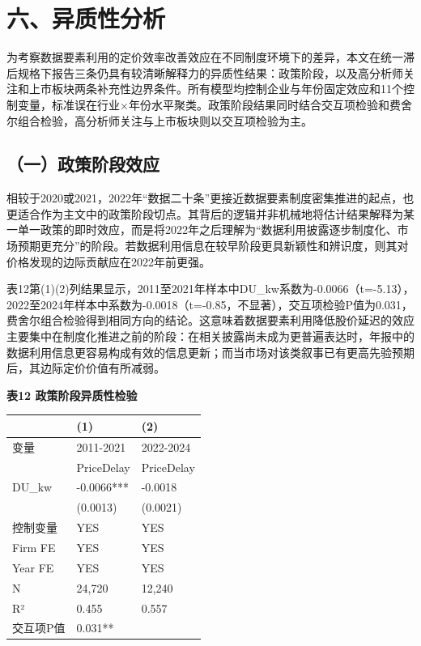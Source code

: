 \section{六、异质性分析}\label{ux516dux5f02ux8d28ux6027ux5206ux6790}

为考察数据要素利用的定价效率改善效应在不同制度环境下的差异，本文在统一滞后规格下报告三条仍具有较清晰解释力的异质性结果：政策阶段，以及高分析师关注和上市板块两条补充性边界条件。所有模型均控制企业与年份固定效应和11个控制变量，标准误在行业×年份水平聚类。政策阶段结果同时结合交互项检验和费舍尔组合检验，高分析师关注与上市板块则以交互项检验为主。

\subsection{（一）政策阶段效应}\label{ux4e00ux653fux7b56ux9636ux6bb5ux6548ux5e94}

相较于2020或2021，2022年``数据二十条''更接近数据要素制度密集推进的起点，也更适合作为主文中的政策阶段切点。其背后的逻辑并非机械地将估计结果解释为某一单一政策的即时效应，而是将2022年之后理解为``数据利用披露逐步制度化、市场预期更充分''的阶段。若数据利用信息在较早阶段更具新颖性和辨识度，则其对价格发现的边际贡献应在2022年前更强。

表12第(1)(2)列结果显示，2011至2021年样本中DU\_kw系数为-0.0066（t=-5.13），2022至2024年样本中系数为-0.0018（t=-0.85，不显著），交互项检验P值为0.031，费舍尔组合检验得到相同方向的结论。这意味着数据要素利用降低股价延迟的效应主要集中在制度化推进之前的阶段：在相关披露尚未成为更普遍表达时，年报中的数据利用信息更容易构成有效的信息更新；而当市场对该类叙事已有更高先验预期后，其边际定价价值有所减弱。

\textbf{表12 政策阶段异质性检验}

{\def\LTcaptype{} %
\begin{longtable}[]{@{}lll@{}}
\toprule\noalign{}
& (1) & (2) \\
\midrule\noalign{}
\endhead
\bottomrule\noalign{}
\endlastfoot
变量 & 2011-2021 & 2022-2024 \\
& PriceDelay & PriceDelay \\
DU\_kw & -0.0066*** & -0.0018 \\
& (0.0013) & (0.0021) \\
控制变量 & YES & YES \\
Firm FE & YES & YES \\
Year FE & YES & YES \\
N & 24,720 & 12,240 \\
R² & 0.455 & 0.557 \\
交互项P值 & 0.031** & \\
\end{longtable}
}

